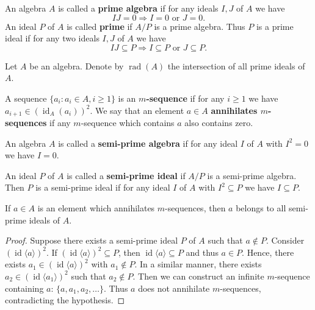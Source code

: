 \documentclass{article}
\begin{document}
\begin{definition}
An algebra $A$ is called a \textbf{prime algebra} if for any ideals $I, J$ of $A$ we have
\[
IJ = 0 \Rightarrow I = 0 \text{ or } J = 0.
\]
An ideal $P$ of $A$ is called \textbf{prime} if $A/P$ is a prime algebra. Thus $P$ is a prime ideal if for any two ideals $I, J$ of $A$ we have
\[
IJ \subseteq P \Rightarrow I \subseteq P \text{ or } J \subseteq P.
\]
\end{definition}

Let $A$ be an algebra. Denote by $\operatorname{rad}(A)$ the intersection of all prime ideals of $A$.

\begin{definition}
A sequence $\{a_i : a_i \in A, i \geq 1\}$ is an \textbf{$m$-sequence} if for any $i \geq 1$ we have $a_{i+1} \in (\operatorname{id}_A(a_i))^2$. We say that an element $a \in A$ \textbf{annihilates $m$-sequences} if any $m$-sequence which contains $a$ also contains zero.
\end{definition}

\begin{definition}
An algebra $A$ is called a \textbf{semi-prime algebra} if for any ideal $I$ of $A$ with $I^2 = 0$ we have $I = 0$.

An ideal $P$ of $A$ is called a \textbf{semi-prime ideal} if $A/P$ is a semi-prime algebra. Then $P$ is a semi-prime ideal if for any ideal $I$ of $A$ with $I^2 \subseteq P$ we have $I \subseteq P$.
\end{definition}

\begin{lemma}
If $a \in A$ is an element which annihilates $m$-sequences, then $a$ belongs to all semi-prime ideals of $A$.
\end{lemma}

\begin{proof}
Suppose there exists a semi-prime ideal $P$ of $A$ such that $a \notin P$. Consider $(\operatorname{id}\langle a\rangle)^2$. If $(\operatorname{id}\langle a\rangle)^2 \subseteq P$, then $\operatorname{id}\langle a\rangle \subseteq P$ and thus $a \in P$. Hence, there exists $a_1 \in (\operatorname{id}\langle a\rangle)^2$ with $a_1 \notin P$. In a similar manner, there exists $a_2 \in (\operatorname{id}\langle a_1\rangle)^2$ such that $a_2 \notin P$. Then we can construct an infinite $m$-sequence containing $a$: $\{a, a_1, a_2, \dots\}$. Thus $a$ does not annihilate $m$-sequences, contradicting the hypothesis.
\end{proof}
\end{document}
